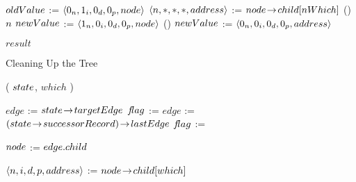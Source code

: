 \begin{limitscope}
\begin{algorithm}[!thb]
{{			\BlankLine
			$oldValue$ := $\langle  0_n, 1_i, 0_d, 0_p, node  \rangle$\;
			$\langle  n, \ast, \ast, \ast, address  \rangle$ := $node \!\rightarrow\! child[nWhich]$\; 
  		\uIf(){$n$}
			{
			   $newValue$ := $\langle  1_n, 0_i, 0_d, 0_p, node  \rangle$\;
			}
			\Else()
			{
			   $newValue$ := $\langle  0_n, 0_i, 0_d, 0_p, address  \rangle$ \;
			}
			
			
			
	 }
	
	  \BlankLine
		\Return $result$\;
		



}

\caption{Cleaning Up the Tree}
\label{algo:cleanup}
\end{algorithm}





\begin{algorithm}[!thb]
\DefineKeyWords


\DontPrintSemicolon
\Boolean \MarkChildEdge( $state$, $which$ )\;
\PrintSemicolon
\Begin
{

	 {
	    $edge$ := $state \!\rightarrow\! targetEdge$\; 
	    $f\!lag$ := \DELETEFLAG\;
	 }
	 \Else
	 {
	    $edge$ := $( state \!\rightarrow\! successorRecord ) \!\rightarrow\! lastEdge$\; 
	    $f\!lag$ := \PROMOTEFLAG\;
	 }
	 
	 
   $node$ := $edge.child$\;
	
   \BlankLine
  
	 \While{\True}
	 {
	    $\langle n, i, d, p, address \rangle$ := $node \!\rightarrow\! child[which]$\;
			
}}
\end{algorithm}
\end{limitscope}
